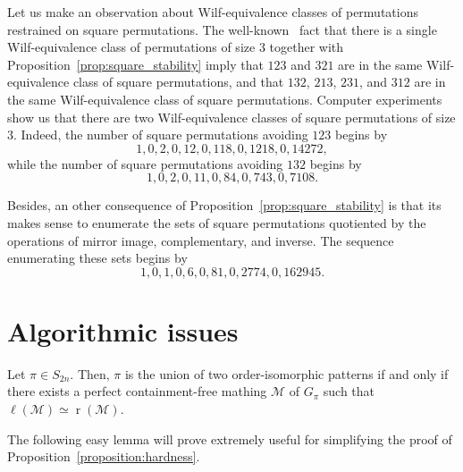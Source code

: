 \documentclass[a4paper]{llncs}
\DeclareMathOperator{\LEFT}{\ell}
\DeclareMathOperator{\RIGHT}{r}
\begin{document}
Let us make an observation about Wilf-equivalence classes of
permutations restrained on square permutations. The
well-known~\cite{Simion:Schmidt:EJC:1985} fact that there is a single
Wilf-equivalence class of permutations of size $3$ together with
Proposition~\ref{prop:square_stability} imply that $123$ and $321$ are
in the same Wilf-equivalence class of square permutations, and that
$132$, $213$, $231$, and $312$ are in the same Wilf-equivalence class of
square permutations. Computer experiments show us that there are two
Wilf-equivalence classes of square permutations of size $3$. Indeed, the
number of square permutations avoiding $123$ begins by
\begin{equation}
    1, 0, 2, 0, 12, 0, 118, 0, 1218, 0, 14272,
\end{equation}
while the number of square permutations avoiding $132$ begins by
\begin{equation}
    1, 0, 2, 0, 11, 0, 84, 0, 743, 0, 7108.
\end{equation}
\medskip

Besides, an other consequence of Proposition~\ref{prop:square_stability}
is that its makes sense to enumerate the sets of square permutations
quotiented by the operations of mirror image, complementary, and
inverse. The sequence enumerating these sets begins by
\begin{equation}
    1, 0, 1, 0, 6, 0, 81, 0, 2774, 0, 162945.
\end{equation}
\medskip


\section{Algorithmic issues}
\label{section:Algorithmic issues}


\begin{proposition}
  \label{proposition:matching}
  Let $\pi \in S_{2n}$.
  Then,
  $\pi$ is the union of two order-isomorphic patterns
  if and only if
  there exists a perfect containment-free mathing
  $\mathcal{M}$ of $G_\pi$ such that
  $\LEFT(\mathcal{M}) \simeq \RIGHT(\mathcal{M})$.
\end{proposition}

The following easy lemma will prove extremely useful for simplifying the proof of
Proposition~\ref{proposition:hardness}.
\end{document}
